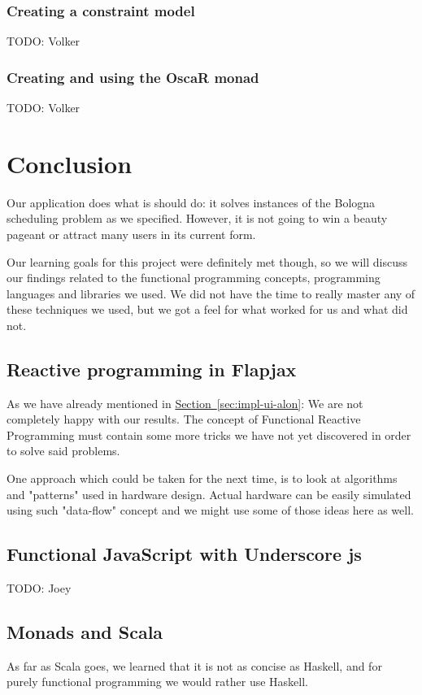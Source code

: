 \documentclass[a4paper]{article}
\begin{document}
\subsubsection{Creating a constraint model}
{\Large TODO:} Volker

\subsubsection{Creating and using the OscaR monad}
{\Large TODO:} Volker



\section{Conclusion}
\label{sec:conclusion}
Our application does what is should do:
it solves instances of the Bologna scheduling problem as we specified.
However, it is not going to win a beauty pageant or attract many users in its 
current form.

Our learning goals for this project were definitely met though,
so we will discuss our findings related to the functional programming concepts,
programming languages and libraries we used.
We did not have the time to really master any of these techniques we used,
but we got a feel for what worked for us and what did not.

\subsection{Reactive programming in Flapjax}
As we have already mentioned in 
\hyperref[sec:impl-ui-alon]{Section~\ref*{sec:impl-ui-alon}}:
We are not completely happy with our results.
The concept of Functional Reactive Programming must contain some more tricks we
have not yet discovered in order to solve said problems. 

One approach which could
be taken for the next time, is to look at algorithms and "patterns" used in hardware
design. Actual hardware can be easily simulated using such "data-flow" concept
and we might use some of those ideas here as well.

\subsection{Functional JavaScript with Underscore js}
{\Large TODO:} Joey

\subsection{Monads and Scala}
As far as Scala goes, 
we learned that it is not as concise as Haskell,
and for purely functional programming we would rather use Haskell.
\end{document}
